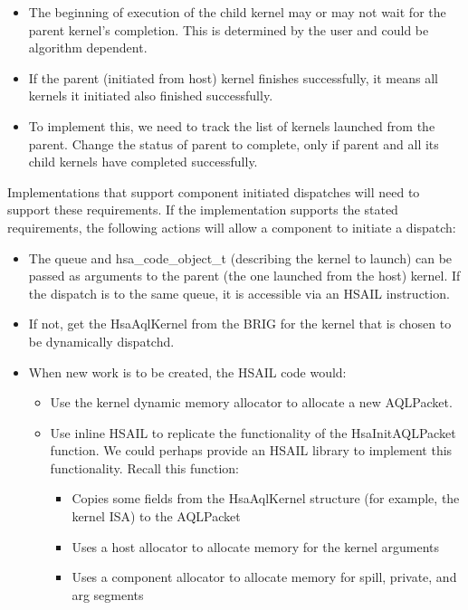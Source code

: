 \documentclass{book}
\newcommand{\reftyp}[1]{#1}
\begin{document}
\begin{appendices}
\begin{itemize}
\begin{itemize}
\item The beginning of execution of the child kernel may or may not
wait for the parent kernel's completion. This is determined by the
user and could be algorithm dependent.
\item If the parent (initiated from host) kernel finishes
successfully, it means all kernels it initiated also finished
successfully.
\item To implement this, we need to track the list of kernels
launched from the parent. Change the status of parent to complete,
only if parent and all its child kernels have completed
successfully.
\end{itemize}
\end{itemize}

Implementations that support component initiated dispatches will
need to support these requirements. If the implementation supports
the stated requirements, the following actions will allow a
component to initiate a dispatch:
\begin{itemize}
\item The queue and \reftyp{hsa\_code\_object\_t} (describing the
kernel to launch) can be passed as arguments to the parent (the one
launched from the host) kernel. If the dispatch is to the same
queue, it is accessible via an HSAIL instruction.
\item If not, get the Hsa\-Aql\-Kernel from the BRIG for the
kernel that is chosen to be dynamically dispatchd.
\item When new work is to be created, the HSAIL code would\-:
\begin{itemize}
\item Use the kernel dynamic memory allocator to allocate a new
AQL\-Packet.
\item Use inline HSAIL to replicate the functionality of the
Hsa\-Init\-AQL\-Packet function. We could perhaps provide an
HSAIL library to implement this functionality. Recall this
function\-:
\begin{itemize}
\item Copies some fields from the Hsa\-Aql\-Kernel structure (for
example, the kernel ISA) to the AQL\-Packet
\item Uses a host allocator to allocate memory for the kernel
arguments
\item Uses a component allocator to allocate memory for spill,
private, and arg segments
\end{itemize}
\end{itemize}

\end{itemize}
\end{appendices}
\end{document}
